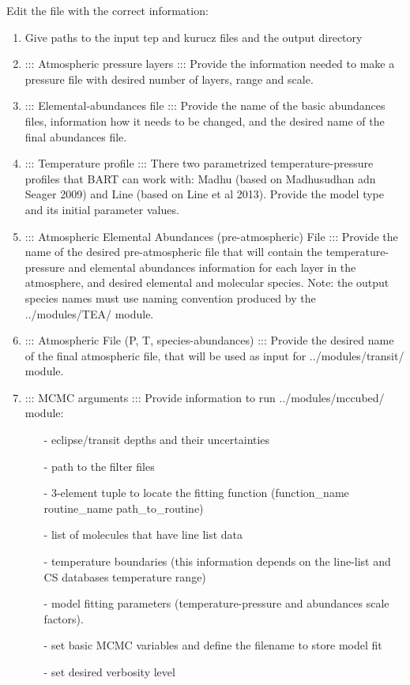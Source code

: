 \documentclass[letterpaper, 12pt]{article}
\begin{document}
\noindent
Edit the file with the correct information:
\begin{enumerate}

\item Give paths to the input tep and kurucz files and the output
     directory

\item ::: Atmospheric pressure layers :::
     Provide the information needed to make a pressure file with desired
     number of layers, range and scale.

\item ::: Elemental-abundances file :::
    Provide the name of the basic abundances files, information how it
    needs to be changed, and the desired name of the final abundances
    file.

\item ::: Temperature profile :::
    There two parametrized temperature-pressure profiles that BART
    can work with: Madhu (based on Madhusudhan adn Seager 2009) and
    Line (based on Line et al 2013). Provide the model type and
    its initial parameter values.

\item ::: Atmospheric Elemental Abundances (pre-atmospheric) File :::
    Provide the name of the desired pre-atmospheric file that will
    contain the temperature-pressure and elemental abundances information
    for each layer in the atmosphere, and desired elemental and molecular
    species. Note: the output species names must use naming convention
    produced by the ../modules/TEA/ module.

\item ::: Atmospheric File (P, T, species-abundances)  :::
     Provide the desired name of the final atmospheric file, that will
     be used as input for ../modules/transit/ module.

\item ::: MCMC arguments  :::
     Provide information to run ../modules/mccubed/ module:
     \begin{enumerate}
    \item[-]eclipse/transit depths and their uncertainties
    \item[-]path to the filter files
    \item[-]3-element tuple to locate the fitting function
         (function\_name routine\_name path\_to\_routine)
    \item[-]list of molecules that have line list data
    \item[-]temperature boundaries (this information depends on the
         line-list and CS databases temperature range)
    \item[-]model fitting parameters (temperature-pressure and abundances
         scale factors).
    \item[-]set basic MCMC variables and define the filename to store
         model fit
    \item[-]set desired verbosity level
     \end{enumerate}


\end{enumerate}
\end{document}
